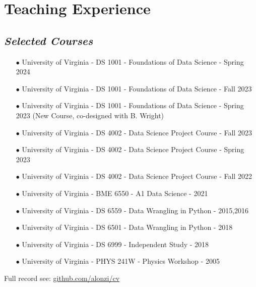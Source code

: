 \documentclass{article}[10pt]
\begin{document}

\section*{Teaching Experience}
\subsection*{\emph{Selected Courses}}
\begin{itemize}
\item [$\bullet$] University of Virginia - DS 1001 - Foundations of Data Science - Spring 2024 
\item [$\bullet$] University of Virginia - DS 1001 - Foundations of Data Science - Fall 2023 
\item [$\bullet$] University of Virginia - DS 1001 - Foundations of Data Science - Spring 2023 (New Course, co-designed with B. Wright)
\item [$\bullet$] University of Virginia - DS 4002 - Data Science Project Course - Fall 2023
\item [$\bullet$] University of Virginia - DS 4002 - Data Science Project Course - Spring 2023
\item [$\bullet$] University of Virginia - DS 4002 - Data Science Project Course - Fall 2022
\item [$\bullet$] University of Virginia - BME 6550 - A1 Data Science - 2021
\item [$\bullet$] University of Virginia - DS 6559 - Data Wrangling in Python - 2015,2016
\item [$\bullet$] University of Virginia - DS 6501 - Data Wrangling in Python - 2018
\item [$\bullet$] University of Virginia - DS 6999 - Independent Study - 2018
\item [$\bullet$] University of Virginia - PHYS 241W - Physics Workshop - 2005
\end{itemize}
Full record see: \href{https://github.com/alonzi/cv/blob/master/teaching-record.md}{github.com/alonzi/cv}

\end{document}
